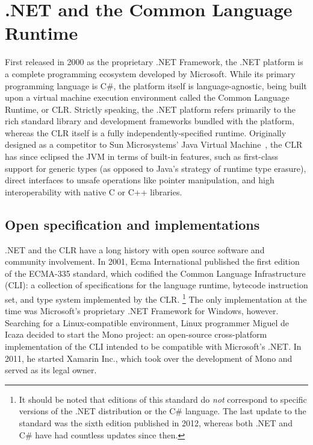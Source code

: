 \section{.NET and the Common Language Runtime}
First released in 2000 as the proprietary .NET Framework, the .NET platform is a complete programming ecosystem developed by Microsoft.
While its primary programming language is C\#, the platform itself is language-agnostic,
being built upon a virtual machine execution environment called the Common Language Runtime, or CLR.
Strictly speaking, the .NET platform refers primarily to the rich standard library and development frameworks bundled with the platform,
whereas the CLR itself is a fully independently-specified runtime.
Originally designed as a competitor to Sun Microsystems' Java Virtual Machine~\cite{20yrsdotnet},
the CLR has since eclipsed the JVM in terms of built-in features, such as first-class support for generic types
(as opposed to Java's strategy of runtime type erasure), direct interfaces to unsafe operations like pointer manipulation,
and high interoperability with native C or C++ libraries.

\subsection{Open specification and implementations}
.NET and the CLR have a long history with open source software and community involvement.
In 2001, Ecma International published the first edition of the ECMA-335 standard, which codified the Common Language Infrastructure (CLI):
a collection of specifications for the language runtime, bytecode instruction set, and type system implemented by the CLR.
\footnote{It should be noted that editions of this standard do \textit{not} correspond to specific versions of the .NET distribution or the C\# language.
The last update to the standard was the sixth edition published in 2012, whereas both .NET and C\# have had countless updates since then.}
The only implementation at the time was Microsoft's proprietary .NET Framework for Windows, however.
Searching for a Linux-compatible environment, Linux programmer Miguel de Icaza decided to start the Mono project: an open-source cross-platform implementation of the CLI intended to be compatible with Microsoft's .NET.
In 2011, he started Xamarin Inc., which took over the development of Mono and served as its legal owner.

